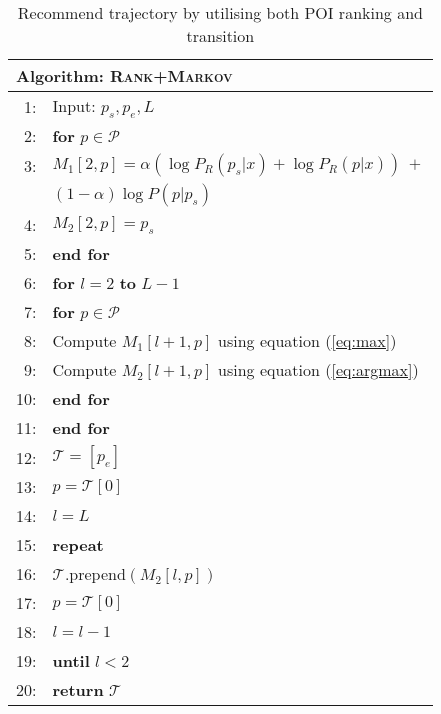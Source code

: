 \begin{table}
\centering
\small
\begin{tabular}{rl}
\hline
\multicolumn{2}{l}{\textbf{Algorithm}: \textsc{Rank+Markov}} \\
\hline
 1:& Input: $p_s, p_e, L$ \\
 2:&\textbf{for} $p \in \mathcal{P}$ \\
 3:&\hspace{10pt}$M_1[2, p] = \alpha ( \log P_R(p_s|x) + \log P_R(p|x) ) ~+ $ \\
   &\hspace{50pt}            $(1-\alpha) \log P(p|p_s)$ \\
 4:&\hspace{10pt}$M_2[2, p] = p_s$ \\
 5:&\textbf{end for} \\
 6:&\textbf{for} $l=2$ \textbf{to} $L-1$ \\
 7:&\hspace{10pt}\textbf{for} $p \in \mathcal{P}$ \\
 8:&\hspace{20pt}   Compute $M_1[l+1, p]$ using equation (\ref{eq:max}) \\
 9:&\hspace{20pt}   Compute $M_2[l+1, p]$ using equation (\ref{eq:argmax}) \\
10:&\hspace{10pt}\textbf{end for} \\
11:&\textbf{end for} \\
12:&$\mathcal{T}= [p_e]$ \\
13:&$p = \mathcal{T}[0]$ \\
14:&$l = L$ \\
15:&\textbf{repeat} \\
16:&\hspace{10pt}$\mathcal{T}$.prepend$(M_2[l, p])$ \\
17:&\hspace{10pt}$p = \mathcal{T}[0]$ \\
18:&\hspace{10pt}$l = l - 1$ \\
19:&\textbf{until} $l < 2$ \\
20:&\textbf{return} $\mathcal{T}$ \\
\hline
\end{tabular}
    \caption{Recommend trajectory by utilising both POI ranking and transition}
\label{algo:dp}
\end{table}

